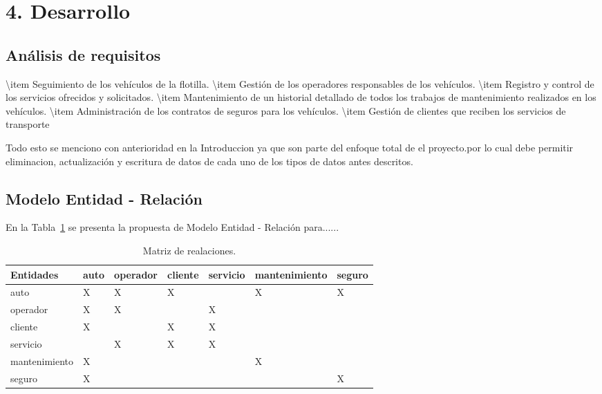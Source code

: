 \documentclass{article}
\begin{document}
\section{4. Desarrollo}
    \subsection{Análisis de requisitos}
      \textbackslash{}item Seguimiento de los vehículos de la flotilla.
    \textbackslash{}item Gestión de los operadores responsables de los vehículos.
    \textbackslash{}item Registro y control de los servicios ofrecidos y solicitados.
    \textbackslash{}item Mantenimiento de un historial detallado de todos los trabajos de mantenimiento realizados en los vehículos.
    \textbackslash{}item Administración de los contratos de seguros para los vehículos.
    \textbackslash{}item Gestión de clientes que reciben los servicios de transporte
    
    Todo esto se menciono con anterioridad en la Introduccion ya que son parte del enfoque total de el proyecto.por lo cual debe permitir eliminacion, actualización y escritura de datos de cada uno de los tipos de datos antes descritos.
    
    \subsection{Modelo Entidad - Relación}
        En la Tabla~\ref{matriz1} se presenta la propuesta de Modelo Entidad - Relación para......

        \begin{table}[!ht]
        \begin{center}
        \caption{Matriz de realaciones.}
        \label{matriz1}
        
        \begin{tabular}{|l|l|l|l|l|l|l|}            
            \hline  
            Entidades        & auto & operador & cliente & servicio & mantenimiento & seguro \\
               \hline
            auto          & X & X & X &   & X & X \\
            \hline
            operador      & X & X &   & X &   &   \\
            \hline
            cliente     & X &   & X & X &   &   \\
            \hline
            servicio        &   & X & X & X &   &   \\
            \hline
            mantenimiento           & X &   &   &   & X &   \\
            \hline
            seguro           & X &   &   &   &   & X \\
            \hline       
        \end{tabular}
        \end{center}
        \end{table}
\end{document}
